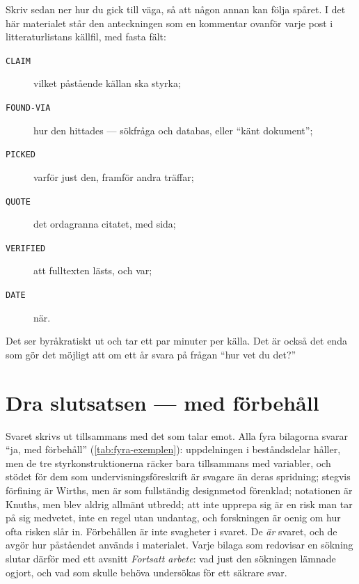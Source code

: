 Skriv sedan ner hur du gick till väga, så att någon annan kan följa
spåret.  I det här materialet står den anteckningen som en kommentar
ovanför varje post i litteraturlistans källfil, med fasta fält:
\begin{description}
  \item[\texttt{CLAIM}] vilket påstående källan ska styrka;
  \item[\texttt{FOUND-VIA}] hur den hittades --- sökfråga och databas,
    eller \enquote{känt dokument};
  \item[\texttt{PICKED}] varför just den, framför andra träffar;
  \item[\texttt{QUOTE}] det ordagranna citatet, med sida;
  \item[\texttt{VERIFIED}] att fulltexten lästs, och var;
  \item[\texttt{DATE}] när.
\end{description}
Det ser byråkratiskt ut och tar ett par minuter per källa.  Det är också
det enda som gör det möjligt att om ett år svara på frågan \enquote{hur
vet du det?}

\section{Dra slutsatsen --- med förbehåll}

Svaret skrivs ut tillsammans med det som talar emot.  Alla fyra bilagorna
svarar \enquote{ja, med förbehåll} (\cref{tab:fyra-exemplen}): uppdelningen i beståndsdelar håller,
men de tre styrkonstruktionerna räcker bara tillsammans med variabler, och
stödet för dem som undervisningsföreskrift är svagare än deras spridning;
stegvis förfining är Wirths, men är som
fullständig designmetod förenklad; notationen är Knuths, men blev aldrig
allmänt utbredd; att inte upprepa sig är en risk man tar på sig
medvetet, inte en regel utan undantag, och forskningen är oenig om hur
ofta risken slår in.  Förbehållen är inte svagheter i svaret.  De
\emph{är} svaret, och de avgör hur påståendet används i materialet.
Varje bilaga som redovisar en sökning slutar därför med ett avsnitt
\emph{Fortsatt arbete}: vad just den sökningen lämnade ogjort, och vad
som skulle behöva undersökas för ett säkrare svar.

